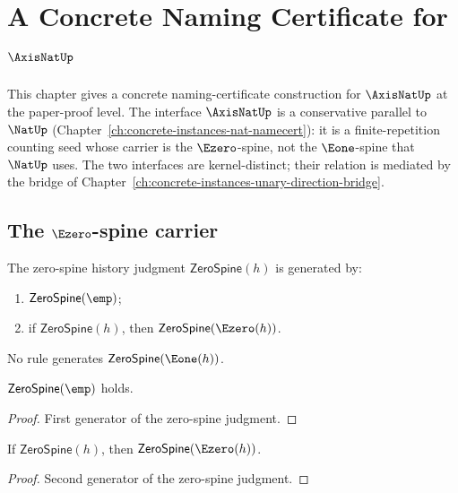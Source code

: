 \chapter{A Concrete Naming Certificate for \(\AxisNatUp\)}
\label{ch:concrete-instances-axisnat-namecert}

This chapter gives a concrete naming-certificate construction for \(\AxisNatUp\) at the paper-proof level. The interface \(\AxisNatUp\) is a conservative parallel to \(\NatUp\) (Chapter~\ref{ch:concrete-instances-nat-namecert}): it is a finite-repetition counting seed whose carrier is the \(\Ezero\)-spine, not the \(\Eone\)-spine that \(\NatUp\) uses. The two interfaces are kernel-distinct; their relation is mediated by the bridge of Chapter~\ref{ch:concrete-instances-unary-direction-bridge}.

\section{The \(\Ezero\)-spine carrier}

\begin{definition}
\label{def:zero-spine-history-judgment}
The zero-spine history judgment \(\mathsf{ZeroSpine}(h)\) is generated by:
\begin{enumerate}
  \item \(\mathsf{ZeroSpine}(\emp)\);
  \item if \(\mathsf{ZeroSpine}(h)\), then \(\mathsf{ZeroSpine}(\Ezero(h))\).
\end{enumerate}
No rule generates \(\mathsf{ZeroSpine}(\Eone(h))\).
\end{definition}

\begin{lemma}
\label{lem:zero-spine-empty-base}
\(\mathsf{ZeroSpine}(\emp)\) holds.
\end{lemma}
\begin{proof}
First generator of the zero-spine judgment.
\end{proof}

\begin{lemma}
\label{lem:zero-spine-closure-under-zero-extension}
If \(\mathsf{ZeroSpine}(h)\), then \(\mathsf{ZeroSpine}(\Ezero(h))\).
\end{lemma}
\begin{proof}
Second generator of the zero-spine judgment.
\end{proof}

